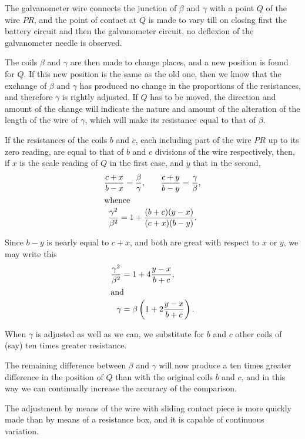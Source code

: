 \documentclass[12pt,oneside]{book}[2021/10/04]
\newcommand{\¬}{\hphantom{0}}
\begin{document}
The galvanometer wire connects the junction of \(\beta\) and \(\gamma\) with
a point \(Q\) of the wire \(PR\), and the point of contact at \(Q\) is made
to vary till on closing first the battery circuit and then the
galvanometer circuit, no deflexion of the galvanometer needle is
observed.

The coils \(\beta\) and \(\gamma\) are then made to change places, and a new
position is found for \(Q\). If this new position is the same as the
old one, then we know that the exchange of \(\beta\) and \(\gamma\) has produced
no change in the proportions of the resistances, and therefore \(\gamma\)
is rightly adjusted. If \(Q\) has to be moved, the direction and
amount of the change will indicate the nature and amount of the
alteration of the length of the wire of \(\gamma\), which will make its resistance
equal to that of \(\beta\).

If the resistances of the coils \(b\) and \(c\), each including part of the
wire \(PR\) up to its zero reading, are equal to that of \(b\) and \(c\) divisions
of the wire respectively, then, if \(x\) is the scale reading of \(Q\) in the
first case, and \(y\) that in the second,
\begin{gather*}
\frac{c + x}{b - x} = \frac{\beta}{\gamma}\text{,} \qquad \frac{c + y}{b - y} = \frac{\gamma}{\beta}\text{,}\\
\shortintertext{whence}
\frac{\gamma ^2}{\beta ^2} = 1 + \frac{(b+c)(y-x)}{(c+x)(b-y)}\text{.}
\end{gather*}

Since \(b - y\) is nearly equal to \(c + x\), and both are great with
respect to \(x\) or \(y\), we may write this
\begin{align*}
\frac{\gamma^2}{\beta^2} &= 1 + 4\frac{y - x}{b + c}\text{,}\\
\shortintertext{and}
\gamma &= \beta\left(1 + 2 \frac{y - x}{b + c}\right)\text{.}
\end{align*}

When \(\gamma\) is adjusted as well as we can, we substitute for \(b\) and \(c\)
other coils of (say) ten times greater resistance.

The remaining difference between \(\beta\) and \(\gamma\) will now produce
a ten times greater difference in the position of \(Q\) than with the
original coils \(b\) and \(c\), and in this way we can continually increase
the accuracy of the comparison.

The adjustment by means of the wire with sliding contact piece
is more quickly made than by means of a resistance box, and it is
capable of continuous variation.
\end{document}
